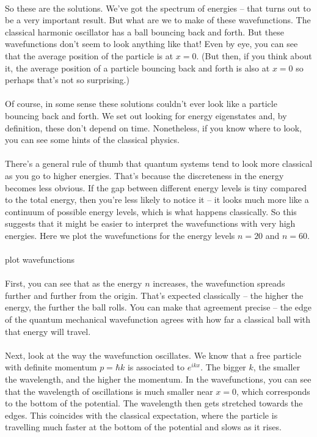 \documentclass[12pt]{article}
\newcommand\para{\paragraph{}}
\newcommand{\cblue}{\color{blue}}
\begin{document}
\para
So these are the solutions. We've got the spectrum of energies -- that turns out to be a very important result. But what are we to make of these wavefunctions. The classical harmonic oscillator has a ball bouncing back and forth. But these wavefunctions don't seem to look anything like that! Even by eye, you can see that the average position of the particle is at $x=0$. (But then, if you think about it, the average position of a particle bouncing back and forth is also at $x=0$ so perhaps that's not so surprising.)

\para
Of course, in some sense these solutions couldn't ever look like a particle bouncing back and forth. We set out looking for energy eigenstates and, by definition, these don't depend on time. Nonetheless, if you know where to look, you can see some hints of the classical physics. 


\para
There's a general rule of thumb that quantum systems  tend to look more classical as you go to higher energies. That's because the discreteness in the energy becomes less obvious. If the gap between different energy levels is tiny compared to the total energy, then you're less likely to notice it -- it looks much more like a continuum of possible energy levels, which is what happens classically. So this suggests that it might be easier to interpret the wavefunctions with very high energies. Here we plot the wavefunctions  for the energy levels $n=20$ and $n=60$.

\para
{\cblue plot wavefunctions}

\para
First, you can see that as the energy $n$ increases, the wavefunction spreads further and further from the origin. That's expected classically -- the higher the energy, the further the ball rolls.  You can make that agreement precise -- the edge of the quantum mechanical wavefunction agrees with how far a classical ball with that energy will travel. 

\para
Next, look at the way the wavefunction oscillates. We know that a free particle with definite momentum $p=\hbar k$ is associated to $e^{ikx}$. The bigger $k$, the smaller the wavelength, and the higher the momentum. In the wavefunctions, you can see that the wavelength of oscillations is much smaller near $x=0$, which corresponds to the  bottom of the potential. The wavelength then  gets stretched towards the edges. This coincides with the classical expectation, where the particle is travelling much faster at the bottom of the potential and slows as it rises.
\end{document}
